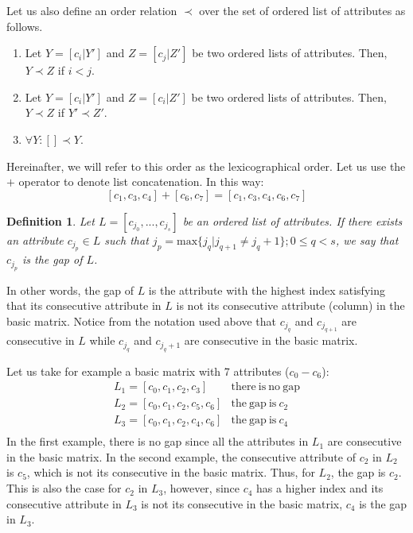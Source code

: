 \documentclass[number,preprint,review,12pt]{elsarticle}
\newtheorem{definition}{Definition}
\begin{document}
	Let us also define an order relation $\prec$ over the set of ordered list of attributes as follows.
	\begin{enumerate}
		\item Let $Y=[c_i|Y']$ and $Z=[c_j|Z']$ be two ordered lists of attributes. Then, $Y \prec Z$ if $i<j$.
		\item Let $Y=[c_i|Y']$ and $Z=[c_i|Z']$ be two ordered lists of attributes. Then, $Y \prec Z$ if $Y' \prec Z'$.
		\item $\forall Y:  [] \prec Y$.
	\end{enumerate}
	Hereinafter, we will refer to this order as the lexicographical order. Let us use the $+$ operator to denote list concatenation. In this way: $$[c_1,c_3,c_4]+[c_6,c_7]=[c_1,c_3,c_4,c_6,c_7]$$
		
	
	\begin{definition}\label{def:gap}
		Let $L = [c_{j_0},...,c_{j_s}]$ be an ordered list of attributes. If there exists an attribute $c_{j_p} \in L$ such that ${j_p}=\mathrm{max}\{j_q | j_{q+1} \neq j_q+1\}; 0 \leq q < s$, we say that $c_{j_p}$ is the gap of $L$.
	\end{definition}
	
	In other words, the gap of $L$ is the attribute with the highest index satisfying that its consecutive attribute in $L$ is not its consecutive attribute (column) in the basic matrix. Notice from the notation used above that $c_{j_q}$ and $c_{j_{q+1}}$ are consecutive in $L$ while $c_{j_q}$ and $c_{j_q+1}$ are consecutive in the basic matrix.
	
	Let us take for example a basic matrix with 7 attributes ($c_0 - c_6$):
	$$\begin{array}{ll}
	{L_1=[c_0,c_1,c_2,c_3]} 		& \mathrm{there~is~no~gap}\\
	{L_2=[c_0,c_1,c_2,c_5,c_6]} 	& \mathrm{the~gap~is~} c_2\\
	{L_3=[c_0,c_1,c_2,c_4,c_6]} 	& \mathrm{the~gap~is~} c_4\\
	\end{array}$$
	In the first example, there is no gap since all the attributes in $L_1$ are consecutive in the basic matrix. In the second example, the consecutive attribute of $c_2$ in $L_2$ is $c_5$, which is not its consecutive in the basic matrix. Thus, for $L_2$, the gap is $c_2$. This is also the case for $c_2$ in $L_3$, however, since $c_4$ has a higher index and its consecutive attribute in $L_3$ is not its consecutive in the basic matrix, $c_4$ is the gap in $L_3$.
\end{document}

